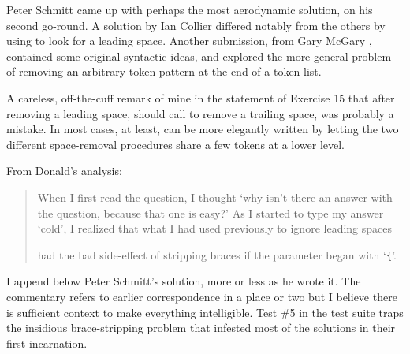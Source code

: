 Peter Schmitt came up with perhaps the most 
aerodynamic solution, on his second go-round. A solution by 
Ian Collier differed notably from
the others by using \cmd{\meaning} to look for a leading space. Another
submission, from 
Gary McGary 
, contained some 
original syntactic ideas,
and explored the more general problem of removing an arbitrary token
pattern at the end of a token list.

A careless, off-the-cuff remark of mine in the statement of Exercise
15 that after removing a leading space, \cmd{\trimspaces} should call
\cmd{\trimspace} to remove a trailing space, was probably a mistake. In most
cases, at least, \cmd{\trimspaces} can be more elegantly written by letting
the two different space-removal procedures share a few tokens at a
lower level.

From Donald's analysis:
\begin{quote}
 When I first read the question, I thought `why isn't there an answer
 with the question, because that one is easy?'  As I started to type
 my answer `cold', I realized that what I had used previously to
 ignore leading spaces 
 had the bad
 side-effect of stripping braces if the parameter began with `\verb?{?'.
\end{quote}

I append below Peter Schmitt's 
solution, more or less as he wrote it.
The commentary refers to earlier correspondence in a place or two but I
believe there is sufficient context to make everything intelligible.
Test \#5 in the test suite traps the insidious brace-stripping problem
that infested most of the solutions in their first incarnation.

\begin{comment}
More on Exercise 15 to follow, some time in the next few days.

Michael Downes, mjd@math.ams.org

\end{comment}

